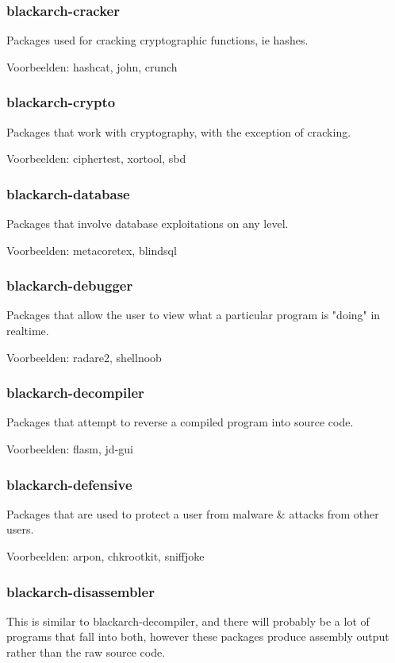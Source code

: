 \documentclass[a4paper, oneside, 11pt]{book}
\begin{document}
\subsubsection{blackarch-cracker}
Packages used for cracking cryptographic functions, ie hashes.

Voorbeelden: hashcat, john, crunch

\subsubsection{blackarch-crypto}
Packages that work with cryptography, with the exception of cracking.

Voorbeelden: ciphertest, xortool, sbd

\subsubsection{blackarch-database}
Packages that involve database exploitations on any level.

Voorbeelden: metacoretex, blindsql

\subsubsection{blackarch-debugger}
Packages that allow the user to view what a particular program is "doing" in realtime.

Voorbeelden: radare2, shellnoob

\subsubsection{blackarch-decompiler}
Packages that attempt to reverse a compiled program into source code.

Voorbeelden: flasm, jd-gui

\subsubsection{blackarch-defensive}
Packages that are used to protect a user from malware \& attacks from other users.

Voorbeelden: arpon, chkrootkit, sniffjoke

\subsubsection{blackarch-disassembler}
This is similar to blackarch-decompiler, and there will probably be a lot
of programs that fall into both, however these packages produce assembly output
rather than the raw source code.
\end{document}
